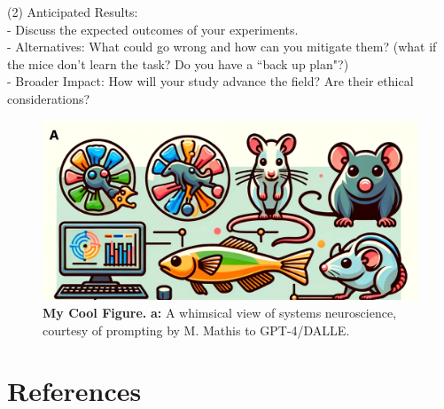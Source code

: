 \documentclass[11pt, notitlepage,a4]{article} %
\begin{document}
\noindent (2) Anticipated Results:\\
- Discuss the expected outcomes of your experiments.\\
- Alternatives: What could go wrong and how can you mitigate them? (what if the mice don’t learn the task? Do you have a ``back up plan"?)\\
- Broader Impact: How will your study advance the field? Are their ethical considerations?

\begin{figure}[ht] 
\centering 
\includegraphics[width=.5\textwidth]{figures/figure1.png} \caption{\textbf{My Cool Figure.} 
\textbf{a:} A whimsical view of systems neuroscience, courtesy of prompting by M. Mathis to GPT-4/DALLE.
}
\label{fig:Figure1} 
\end{figure}

\section{References}



\end{document}
